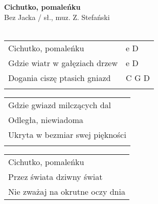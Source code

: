 \documentclass[a5paper]{article}
\begin{document}


\noindent
\fontsize{12pt}{15pt}\selectfont
\textbf{Cichutko, pomaleńku} \\
\fontsize{8pt}{10pt}\selectfont
Bez Jacka / sł., muz. Z. Stefański \\ \\
\fontsize{10pt}{12pt}\selectfont
{}
\begin{tabular}{@{}p{8.00cm}p{3cm}@{}}
\noindent
Cichutko, pomaleńku & e D \\
Gdzie wiatr w gałęziach drzew & e D \\
Dogania ciszę ptasich gniazd & C G D \\ \\
\end{tabular}

\noindent
\begin{tabular}{@{}p{8.00cm}@{}}
Gdzie gwiazd milczących dal \\
Odległa, niewiadoma \\
Ukryta w bezmiar swej piękności \\ \\
\end{tabular}

\noindent
\begin{tabular}{@{}p{8.00cm}@{}}
Cichutko, pomaleńku \\
Przez świata dziwny świat \\
Nie zważaj na okrutne oczy dnia
\end{tabular}
\end{document}
